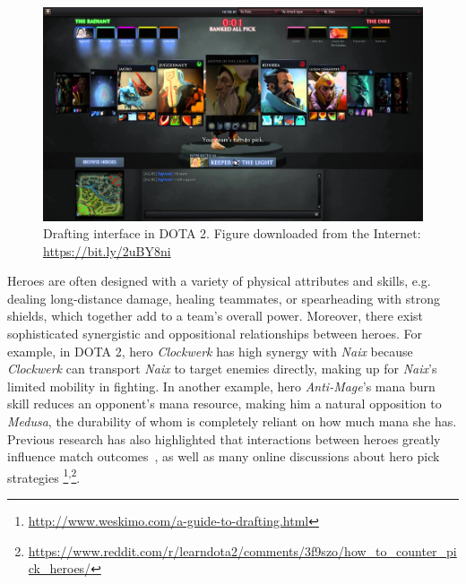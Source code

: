 \begin{figure}
\centering
\includegraphics[width=1\textwidth]{Figures/ranked_all_pick.jpg}
\caption{Drafting interface in DOTA 2. Figure downloaded from the Internet: \url{https://bit.ly/2uBY8ni}}
\label{fig:ranked_all_pick_interface}
\end{figure}



Heroes are often designed with a variety of physical attributes and skills, e.g. dealing long-distance damage, healing teammates, or spearheading with strong shields, which together add to a team's overall power. Moreover, there exist sophisticated synergistic and oppositional relationships between heroes. For example, in DOTA 2, hero \textit{Clockwerk} has high synergy with \textit{Naix} because \textit{Clockwerk} can transport \textit{Naix} to target enemies directly, making up for \textit{Naix}'s limited mobility in fighting. In another example, hero \textit{Anti-Mage}'s mana burn skill reduces an opponent's mana resource, making him a natural opposition to \textit{Medusa}, the durability of whom is completely reliant on how much mana she has. Previous research has also highlighted that interactions between heroes greatly influence match outcomes~\cite{pobie1,Semenov2016,kim2016proficiency}, as well as many online discussions about hero pick strategies \footnote{\url{http://www.weskimo.com/a-guide-to-drafting.html}}\textsuperscript{,}\footnote{\url{https://www.reddit.com/r/learndota2/comments/3f9szo/how_to_counter_pick_heroes/}}. 
 

